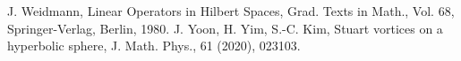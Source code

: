\documentclass[1 [leqno, 11pt]{amsart}
\numberwithin{equation}{section}
\begin{document}
\begin{CJK*}{GBK}{song}
\begin{thebibliography}{99}
   J. Weidmann, Linear Operators in Hilbert Spaces, Grad. Texts in Math., Vol. 68, Springer-Verlag, Berlin, 1980.
  J. Yoon,  H. Yim,  S.-C. Kim,   Stuart vortices on a hyperbolic sphere, J. Math. Phys.,
61 (2020), 023103.

\end{thebibliography}
\end{CJK*}
\end{document}
